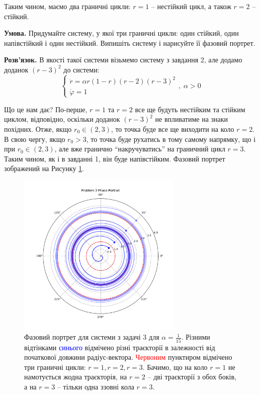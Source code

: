 \documentclass[oneside,solution]{tmpl}
\begin{document}
Таким чином, маємо два граничні цикли: $r=1$ -- нестійкий цикл, а також $r=2$ -- стійкий.


\textbf{Умова.} Придумайте систему, у якої три граничні цикли: один стійкий, один напівстійкий і один нестійкий. Випишіть систему і нарисуйте її фазовий портрет.

\textbf{Розв'язок.} В якості такої системи візьмемо систему з завдання 2, але додамо доданок $(r-3)^2$ до системи:
\begin{equation}
    \begin{cases}
        \dot{r} = \alpha r(1-r)(r-2)(r-3)^2 \\
        \dot{\varphi} = 1
    \end{cases}, \; \alpha > 0
\end{equation}

Що це нам дає? По-перше, $r=1$ та $r=2$ все ще будуть нестійким та стійким циклом, відповідно, оскільки доданок $(r-3)^2$ не впливатиме на знаки похідних. Отже, якщо $r_0 \in (2,3)$, то точка буде все ще виходити на коло $r=2$. В свою чергу, якщо $r_0 > 3$, то точка буде рухатись в тому самому напрямку, що і при $r_0 \in (2,3)$, але вже гранично ``накручуватись'' на граничний цикл $r=3$. Таким чином, як і в завданні 1, він буде напівстійким. Фазовий портрет зображений на Рисунку \ref{fig:problem_3}. 

\begin{figure}
    \centering
    \includegraphics[width=0.7\textwidth]{images/hw_6/problem_3.pdf}
    \caption{Фазовий портрет для системи з задачі $3$ для $\alpha=\frac{1}{15}$. Різними відтінками \textcolor{blue}{синього} відмічено різні траєкторії в залежності від початкової довжини радіус-вектора. \textcolor{red}{Червоним} пунктиром відмічено три граничні цикли: $r=1,r=2,r=3$. Бачимо, що на коло $r=1$ не намотується жодна траєкторія, на $r=2$ -- дві траєкторії з обох боків, а на $r=3$ -- тільки одна ззовні кола $r=3$.}
    \label{fig:problem_3}
\end{figure}
\end{document}
